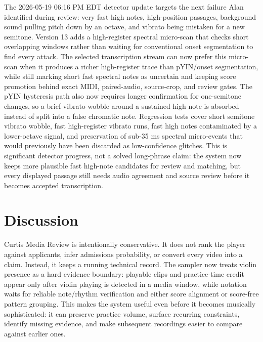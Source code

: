 \documentclass[12pt,letterpaper]{article}
\begin{document}
The 2026-05-19 06:16 PM EDT detector update targets the next failure Alan identified during review: very fast high notes, high-position passages, background sound pulling pitch down by an octave, and vibrato being mistaken for a new semitone. Version 13 adds a high-register spectral micro-scan that checks short overlapping windows rather than waiting for conventional onset segmentation to find every attack. The selected transcription stream can now prefer this micro-scan when it produces a richer high-register trace than pYIN/onset segmentation, while still marking short fast spectral notes as uncertain and keeping score promotion behind exact MIDI, paired-audio, source-crop, and review gates. The pYIN hysteresis path also now requires longer confirmation for one-semitone changes, so a brief vibrato wobble around a sustained high note is absorbed instead of split into a false chromatic note. Regression tests cover short semitone vibrato wobble, fast high-register vibrato runs, fast high notes contaminated by a lower-octave signal, and preservation of sub-35 ms spectral micro-events that would previously have been discarded as low-confidence glitches. This is significant detector progress, not a solved long-phrase claim: the system now keeps more plausible fast high-note candidates for review and matching, but every displayed passage still needs audio agreement and source review before it becomes accepted transcription.

\section{Discussion}

Curtis Media Review is intentionally conservative. It does not rank the player against applicants, infer admissions probability, or convert every video into a claim. Instead, it keeps a running technical record. The sampler now treats violin presence as a hard evidence boundary: playable clips and practice-time credit appear only after violin playing is detected in a media window, while notation waits for reliable note/rhythm verification and either score alignment or score-free pattern grouping. This makes the system useful even before it becomes musically sophisticated: it can preserve practice volume, surface recurring constraints, identify missing evidence, and make subsequent recordings easier to compare against earlier ones.
\end{document}
